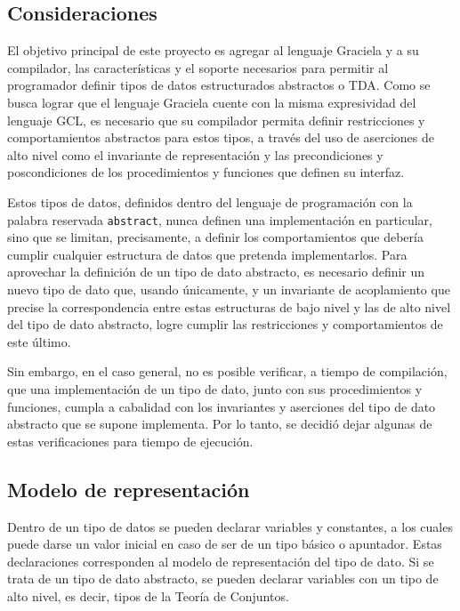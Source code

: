 

\subsection{Consideraciones}

El objetivo principal de este proyecto es agregar al lenguaje Graciela y a su
compilador, las características y el soporte necesarios para permitir al
programador definir tipos de datos estructurados abstractos o TDA. Como se busca
lograr que el lenguaje Graciela cuente con la misma expresividad del lenguaje
GCL, es necesario que su compilador permita definir restricciones y
comportamientos abstractos para estos tipos, a través del uso de aserciones de
alto nivel como el invariante de representación y las precondiciones y
poscondiciones de los procedimientos y funciones que definen su interfaz.

Estos tipos de datos, definidos dentro del lenguaje de programación con la
palabra reservada \texttt{abstract}, nunca definen una implementación en
particular, sino que se limitan, precisamente, a definir los comportamientos que
debería cumplir cualquier estructura de datos que pretenda implementarlos. Para
aprovechar la definición de un tipo de dato abstracto, es necesario definir un
nuevo tipo de dato que, usando únicamente, 
y un invariante de acoplamiento que precise la correspondencia entre estas
estructuras de bajo nivel y las de alto nivel del tipo de dato abstracto, logre
cumplir las restricciones y comportamientos de este último.

Sin embargo, en el caso general, no es posible verificar, a tiempo de
compilación, que una implementación de un tipo de dato, junto con sus
procedimientos y funciones, cumpla a cabalidad con los invariantes y aserciones
del tipo de dato abstracto que se supone implementa. Por lo tanto, se decidió
dejar algunas de estas verificaciones para tiempo de ejecución.

\subsection{Modelo de representación}
Dentro de un tipo de datos se pueden declarar variables y constantes, a los
cuales puede darse un valor inicial en caso de ser de un tipo básico o
apuntador. Estas declaraciones corresponden al modelo de representación
del tipo de dato. Si se trata de un tipo de dato abstracto, se pueden declarar
variables con un tipo de alto nivel, es decir, tipos de la Teoría de Conjuntos.

